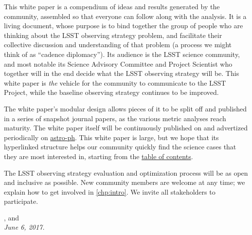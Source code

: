 \noindent This white paper is a compendium of ideas and results
generated by the community, assembled so that everyone can follow along
with the analysis. It is a living document, whose purpose is to bind
together the group of people who are thinking about the LSST observing
strategy problem, and facilitate their collective discussion and
understanding of that problem (a process we might think of as  ``cadence
diplomacy''). Its audience is the LSST science community, and most notable its Science
Advisory Committee and Project Scientist who together will in the end decide what the LSST observing strategy will be. This white paper is {\it
the} vehicle for the community to communicate to the LSST Project, while
the baseline observing strategy continues to be improved.

\noindent The white paper's modular design allows pieces of it to be
split off and published in a series of snapshot journal papers, as the
various metric analyses reach maturity. The white paper itself will be
continuously published on
\href{https://github.com/LSSTScienceCollaborations/ObservingStrategy}{\GitHub}
and advertized periodically on \href{http://arxiv.org}{astro-ph}. This
white paper is large, but we hope that its hyperlinked structure helps
our community quickly find the science cases that they are most interested in,
starting from the \hyperref[toc]{table of contents}.

\noindent The LSST observing strategy evaluation and optimization
process will be as open and inclusive as possible. New community members
are welcome at any time; we explain how to get involved in \autoref{chp:intro}.  We invite all stakeholders to participate.

\vspace{2\baselineskip}

{\raggedleft {},  and  \\
 \medskip \hspace{0.8\linewidth} \it June 6, 2017.}

\clearpage
